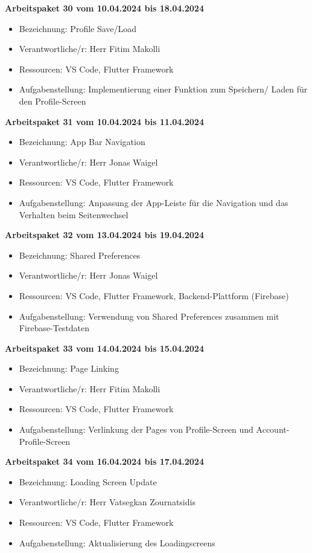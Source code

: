 \textbf{Arbeitspaket 30 vom 10.04.2024 bis 18.04.2024}
\begin{itemize}[itemsep=0pt]
    \item{Bezeichnung: Profile Save/Load} 
	\item{Verantwortliche/r: Herr Fitim Makolli} 
	\item{Ressourcen: VS Code, Flutter Framework} 
    \item{Aufgabenstellung: Implementierung einer Funktion zum Speichern/ Laden für den Profile-Screen}
\end{itemize}

\textbf{Arbeitspaket 31 vom 10.04.2024 bis 11.04.2024}
\begin{itemize}[itemsep=0pt]
    \item{Bezeichnung: App Bar Navigation} 
	\item{Verantwortliche/r: Herr Jonas Waigel} 
	\item{Ressourcen: VS Code, Flutter Framework} 
    \item{Aufgabenstellung: Anpassung der App-Leiste für die Navigation und das Verhalten beim Seitenwechsel}
\end{itemize} 

\textbf{Arbeitspaket 32 vom 13.04.2024 bis 19.04.2024}
\begin{itemize}[itemsep=0pt]
    \item{Bezeichnung: Shared Preferences} 
	\item{Verantwortliche/r: Herr Jonas Waigel} 
	\item{Ressourcen: VS Code, Flutter Framework, Backend-Plattform (Firebase)}
    \item{Aufgabenstellung: Verwendung von Shared Preferences zusammen mit Firebase-Testdaten} 
\end{itemize}

\newpage
\textbf{Arbeitspaket 33 vom 14.04.2024 bis 15.04.2024}
\begin{itemize}[itemsep=0pt]
    \item{Bezeichnung: Page Linking} 
	\item{Verantwortliche/r: Herr Fitim Makolli} 
	\item{Ressourcen: VS Code, Flutter Framework} 
    \item{Aufgabenstellung: Verlinkung der Pages von Profile-Screen und Account-Profile-Screen}
\end{itemize}

\textbf{Arbeitspaket 34 vom 16.04.2024 bis 17.04.2024}
\begin{itemize}[itemsep=0pt]
    \item{Bezeichnung: Loading Screen Update} 
	\item{Verantwortliche/r: Herr Vatsegkan Zournatsidis} 
	\item{Ressourcen: VS Code, Flutter Framework} 
    \item{Aufgabenstellung: Aktualisierung des Loadingscreens}
\end{itemize} 

